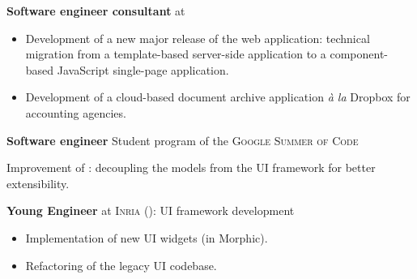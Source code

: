 \begin{rubric}{
}


 \textbf{Software engineer consultant} at 

\begin{itemize}
\item Development of a new major release of the web
  application: technical migration from a template-based server-side application to a component-based JavaScript single-page application.
\item Development of a cloud-based document archive application \emph{à la} Dropbox for
  accounting agencies.
\end{itemize}

 \textbf{Software engineer} Student program of the \textsc{Google Summer of Code}

\medskip

Improvement of : decoupling the models from the UI framework for better extensibility.



\entry*[March 2013] \textbf{Young Engineer} at \textsc{Inria} (): UI framework development

\begin{itemize}
    \item Implementation of new UI widgets (in Morphic).
    \item Refactoring of the legacy UI codebase.
\end{itemize}


\end{rubric}
